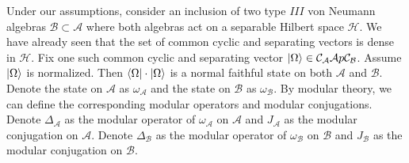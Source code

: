 \documentclass[a4paper,11pt]{article}
\theoremstyle{definition}
\begin{document}
Under our assumptions, consider an inclusion of two type $III$ von Neumann algebras $\mathcal{B}\subset \mathcal{A}$ where both algebras act on a separable Hilbert space $\mathcal{H}$. We have already seen that the set of common cyclic and separating vectors is dense in $\mathcal{H}$. Fix one such common cyclic and separating vector $\ket{\Omega}\in\mathcal{C}_\mathcal{A}\mathcal{A}p\mathcal{C}_\mathcal{B}$. Assume $\ket{\Omega}$ is normalized. Then $\bra{\Omega}\cdot\ket{\Omega}$ is a normal faithful state on both $\mathcal{A}$ and $\mathcal{B}$. Denote the state on $\mathcal{A}$ as $\omega_\mathcal{A}$ and the state on $\mathcal{B}$ as $\omega_\mathcal{B}$. By modular theory, we can define the corresponding modular operators and modular conjugations. Denote $\Delta_\mathcal{A}$ as the modular operator of $\omega_\mathcal{A}$ on $\mathcal{A}$ and $J_\mathcal{A}$ as the modular conjugation on $\mathcal{A}$. Denote $\Delta_\mathcal{B}$ as the modular operator of $\omega_\mathcal{B}$ on $\mathcal{B}$ and $J_\mathcal{B}$ as the modular conjugation on $\mathcal{B}$.
\end{document}
